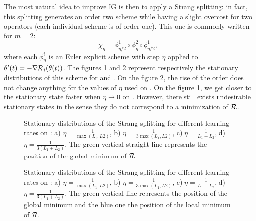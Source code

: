The most natural idea to improve IG is then to apply a Strang splitting: in fact, this splitting generates an order two scheme while having a slight overcost for two operators
(each individual scheme is of order one). This one is commonly written for $m=2$:
\begin{equation*}
	\chi_{\eta} = \phi_{\eta/2}^1 \circ \phi_{\eta}^2 \circ \phi_{\eta/2}^1,
\end{equation*}
where each $\phi_{\eta}^i$ is an Euler explicit scheme with step $\eta$ applied to $\theta'(t) = -\nabla \mathcal{R}_i(\theta(t))$.
The figures \ref{Strang_ex1} and \ref{Strang_ex2} represent respectively the stationary distributions of this scheme for \exOne and \exTwo. On the figure \ref{Strang_ex2}, the rise
of the order does not change anything for the values of $\eta$ used on \exTwo. On the figure \ref{Strang_ex1}, we get closer to the stationary state faster when $\eta \to 0$ on
\exOne. However, there still exists undesirable stationary states in the sense they do not correspond to a minimization of $\mathcal{R}$. 

\begin{figure}[h!]
	\centering
	\scalebox{0.45}{}
	\caption{Stationary distributions of the Strang splitting for different learning rates on \exOne: a) $\eta=\frac{1}{\max(L_1,L2)}$, b) $\eta=\frac{1}{3\max(L_1,L2)}$, c) $\eta=\frac{1}{L_1+L_2}$, d) $\eta=\frac{1}{3(L_1+L_2)}$. The green vertical straight line represents the position of the global minimum of $\mathcal{R}$.}
	\label{Strang_ex1}
\end{figure}

\begin{figure}[h!]
	\centering
	\scalebox{0.45}{}
	\caption{Stationary distributions of the Strang splitting for different learning rates on \exTwo: a) $\eta=\frac{1}{\max(L_1,L2)}$, b) $\eta=\frac{1}{3\max(L_1,L2)}$, c) $\eta=\frac{1}{L_1+L_2}$, d) $\eta=\frac{1}{3(L_1+L_2)}$. The green vertical line represents the position of the global minimum and the blue one the position of the local minimum of $\mathcal{R}$.}
	\label{Strang_ex2}
\end{figure} 

